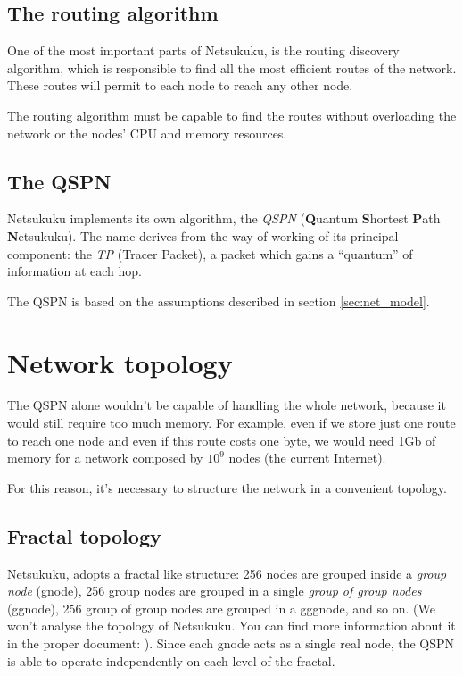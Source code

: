 \documentclass[a4paper]{article}
\begin{document}
\subsection{The routing algorithm}
One of the most important parts of Netsukuku, is the routing discovery
algorithm, which is responsible to find all the most efficient routes of the
network. These routes will permit to each node to reach any other node.

The routing algorithm must be capable to find the routes without overloading
the network or the nodes' CPU and memory resources.

\subsection{The QSPN}

Netsukuku implements its own algorithm, the \emph{QSPN} (\textbf{Q}uantum
\textbf{S}hortest \textbf{P}ath \textbf{N}etsukuku). The name derives from the
way of working of its principal component: the \emph{TP} (Tracer Packet), a
packet which gains a ``quantum'' of information at each hop.

The QSPN is based on the assumptions described in section \ref{sec:net_model}.

\section{Network topology}
\label{sec:net_topology}

The QSPN alone wouldn't be capable of handling the whole network, because it
would still require too much memory. For example, even if we store just one
route to reach one node and even if this route costs one byte, we would need
1Gb of memory for a network composed by $10^9$ nodes (the current Internet).

For this reason, it's necessary to structure the network in a convenient
topology.

\subsection{Fractal topology}
\label{sec:fractal_topology}
Netsukuku, adopts a fractal like structure:
256 nodes are grouped inside a \emph{group node} (gnode), 256 group nodes are grouped
in a single \emph{group of group nodes} (ggnode), 256 group of group nodes are
grouped in a gggnode, and so on.
(We won't analyse the topology of Netsukuku. You can find more information
about it in the proper document: \cite{ntktopology}).
\newline
Since each gnode acts as a single real node,
the QSPN is able to operate independently on each level of the fractal.
\end{document}
